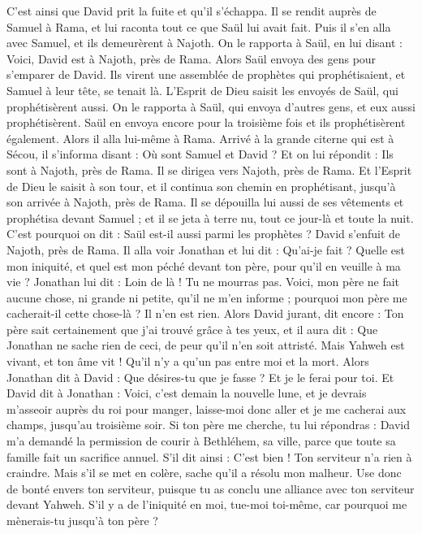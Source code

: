\begin{multicols}{2}
C'est ainsi que David prit la fuite et qu'il s'échappa. Il se rendit auprès de Samuel à Rama, et lui raconta tout ce que Saül lui avait fait. Puis il s'en alla avec Samuel, et ils demeurèrent à Najoth.
On le rapporta à Saül, en lui disant : Voici, David est à Najoth, près de Rama.
Alors Saül envoya des gens pour s'emparer de David. Ils virent une assemblée de prophètes qui prophétisaient, et Samuel à leur tête, se tenait là. L'Esprit de Dieu saisit les envoyés de Saül, qui prophétisèrent aussi.
On le rapporta à Saül, qui envoya d'autres gens, et eux aussi prophétisèrent. Saül en envoya encore pour la troisième fois et ils prophétisèrent également.
Alors il alla lui-même à Rama. Arrivé à la grande citerne qui est à Sécou, il s'informa disant : Où sont Samuel et David ? Et on lui répondit : Ils sont à Najoth, près de Rama.
Il se dirigea vers Najoth, près de Rama. Et l'Esprit de Dieu le saisit à son tour, et il continua son chemin en prophétisant, jusqu'à son arrivée à Najoth, près de Rama.
Il se dépouilla lui aussi de ses vêtements et prophétisa devant Samuel ; et il se jeta à terre nu, tout ce jour-là et toute la nuit. C'est pourquoi on dit : Saül est-il aussi parmi les prophètes ?
\VerseOne{}David s'enfuit de Najoth, près de Rama. Il alla voir Jonathan et lui dit : Qu'ai-je fait ? Quelle est mon iniquité, et quel est mon péché devant ton père, pour qu'il en veuille à ma vie ?
Jonathan lui dit : Loin de là ! Tu ne mourras pas. Voici, mon père ne fait aucune chose, ni grande ni petite, qu'il ne m'en informe ; pourquoi mon père me cacherait-il cette chose-là ? Il n'en est rien.
Alors David jurant, dit encore : Ton père sait certainement que j'ai trouvé grâce à tes yeux, et il aura dit : Que Jonathan ne sache rien de ceci, de peur qu'il n'en soit attristé. Mais Yahweh est vivant, et ton âme vit ! Qu'il n'y a qu'un pas entre moi et la mort.
Alors Jonathan dit à David : Que désires-tu que je fasse ? Et je le ferai pour toi.
Et David dit à Jonathan : Voici, c'est demain la nouvelle lune, et je devrais m'asseoir auprès du roi pour manger, laisse-moi donc aller et je me cacherai aux champs, jusqu'au troisième soir.
Si ton père me cherche, tu lui répondras : David m'a demandé la permission de courir à Bethléhem, sa ville, parce que toute sa famille fait un sacrifice annuel.
S'il dit ainsi : C'est bien ! Ton serviteur n'a rien à craindre. Mais s'il se met en colère, sache qu'il a résolu mon malheur.
Use donc de bonté envers ton serviteur, puisque tu as conclu une alliance avec ton serviteur devant Yahweh. S'il y a de l'iniquité en moi, tue-moi toi-même, car pourquoi me mènerais-tu jusqu'à ton père ?

\end{multicols}
